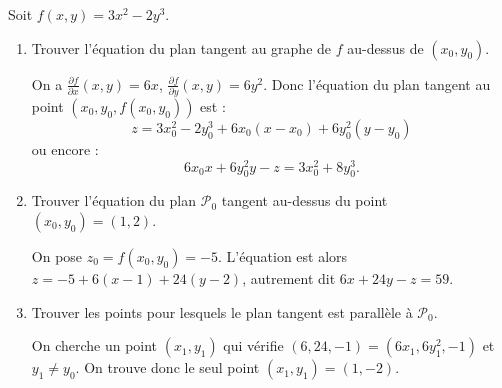 \documentclass[12pt, class=report,crop=false]{standalone}
\begin{document}
\begin{exemple}
Soit $f(x,y) = 3x^2-2y^3$. 

\begin{enumerate}
  \item Trouver l'équation du plan tangent au graphe de $f$ au-dessus de $(x_0,y_0)$.
  
  On a $\frac{\partial f}{\partial x}(x,y) = 6x$, $\frac{\partial f}{\partial y}(x,y) = 6y^2$. Donc l'équation du plan tangent au point $(x_0,y_0,f(x_0,y_0))$ est :
  $$z = 3x_0^2-2y_0^3 + 6x_0(x-x_0)+6y_0^2(y-y_0)$$
  ou encore :
  $$6x_0x+6y_0^2y-z = 3x_0^2+8y_0^3.$$
  
  \item Trouver l'équation du plan $\mathcal{P}_0$ tangent au-dessus du point $(x_0,y_0)=(1,2)$.
  
  On pose $z_0 = f(x_0,y_0) =  -5$. L'équation est alors
  $z = -5 + 6(x-1)+24(y-2)$, autrement dit $6x+24y-z=59$.
    
  \item Trouver les points pour lesquels le plan tangent est parallèle à $\mathcal{P}_0$.
  
  On cherche un point $(x_1,y_1)$ qui vérifie
  $(6,24,-1) = (6x_1,6y_1^2,-1)$  et $y_1 \neq y_0$. On trouve donc le seul point $(x_1,y_1)=(1,-2)$. 
  
\end{enumerate}

\end{exemple}
\end{document}
